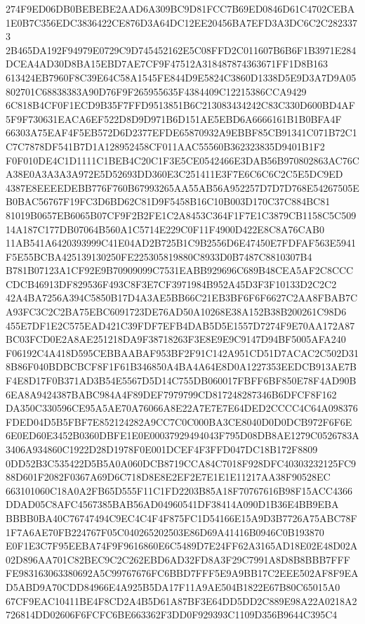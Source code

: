 \documentclass[UTF8,fontset=fandol,zihao=-4,a4paper]{ctexart}
\begin{document}
{{274F9ED06DB0BEBEBE2AAD6A309BC9D81FCC7B69ED0846D61C4702CEBA1E0B7C356EDC3836422CE876D3A64DC12EE20456BA7EFD3A3DC6C2C2823373
2B465DA192F94979E0729C9D745452162E5C08FFD2C011607B6B6F1B3971E284DCEA4AD30D8BA15EBD7AE7CF9F47512A318487874363671FF1D8B163
613424EB7960F8C39E64C58A1545FE844D9E5824C3860D1338D5E9D3A7D9A05802701C68838383A90D76F9F265955635F4384409C12215386CCA9429
6C818B4CF0F1ECD9B35F7FFD9513851B6C213083434242C83C330D600BD4AF5F9F730631EACA6EF522D8D9D971B6D151AE5EBD6A6666161B1B0BFA4F
66303A75EAF4F5EB572D6D2377EFDE65870932A9EBBF85CB91341C071B72C1C7C7878DF541B7D1A128952458CF011AAC55560B362323835D9401B1F2
F0F010DE4C1D1111C1BEB4C20C1F3E5CE0542466E3DAB56B970802863AC76CA38E0A3A3A3A972E5D52693DD360E3C251411E3F7E6C6C6C2C5E5DC9ED
4387E8EEEEDEBB776F760B67993265AA55AB56A952257D7D7D768E54267505EB0BAC56767F19FC3D6BD62C81D9F5458B16C10B003D170C37C884BC81
81019B0657EB6065B07CF9F2B2FE1C2A8453C364F1F7E1C3879CB1158C5C50914A187C177DB07064B560A1C5714E229C0F11F4900D422E8C8A76CAB0
11AB541A6420393999C41E04AD2B725B1C9B2556D6E47450E7FDFAF563E5941F5E55BCBA425139130250FE225305819880C8933D0B7487C8810307B4
B781B07123A1CF92E9B70909099C7531EABB929696C689B48CEA5AF2C8CCCCDCB46913DF829536F493C8F3E7CF3971984B952A45D3F3F10133D2C2C2
42A4BA7256A394C5850B17D4A3AE5BB66C21EB3BF6F6F6627C2AA8FBAB7CA93FC3C2C2BA75EBC6091723DE76AD50A10268E38A152B38B200261C98D6
455E7DF1E2C575EAD421C39FDF7EFB4DAB5D5E1557D7274F9E70AA172A87BC03FCD0E2A8AE251218DA9F38718263F3E8E9E9C9147D94BF5005AFA240
F06192C4A418D595CEBBAABAF953BF2F91C142A951CD51D7ACAC2C502D318B86F040BDBCBCF8F1F61B346850A4BA4A64E8D0A1227353EEDCB913AE7B
F4E8D17F0B371AD3B54E5567D5D14C755DB060017FBFF6BF850E78F4AD90B6EA8A9424387BABC984A4F89DEF7979799CD817248287346B6DFCF8F162
DA350C330596CE95A5AE70A76066A8E22A7E7E7E64DED2CCCC4C64A098376FDED04D5B5FBF7E852124282A9CC7C0C000BA3CE8040D0D0DCB972F6F6E
6E0ED60E3452B0360DBFE1E0E00037929494043F795D08DB8AE1279C0526783A3406A934860C1922D28D1978F0E001DCEF4F3FFD047DC18B172F8809
0DD52B3C535422D5B5A0A060DCB8719CCA84C7018F928DFC40303232125FC988D601F2082F0367A69D6C718D8E8E2EF2E7E1E1E11217AA38F90528EC
663101060C18A0A2FB65D555F11C1FD2203B85A18F70767616B98F15ACC4366DDAD05C8AFC4567385BAB56AD04960541DF38414A090D1B36E4BB9EBA
BBBB0BA40C76747494C9EC4C4F4F875FC1D54166E15A9D3B7726A75ABC78F1F7A6AE70FB224767F05C040265202503E86D69A41416B0946C0B193870
E0F1E3C7F95EEBA74F9F9616860E6C5489D7E24FF62A3165AD18E02E48D02A02D896AA701C82BEC9C2C262EBD6AD32FD8A3F29C7991A8D8B8BBB7FFF
FE983163063380692A5C99767676FC6BBD7FFF5E9A9BB17C2EEE502AF8F9EAD5ABD9A70CDD84966E4A925B5DA17F11A9AE504B1822E67B80C65015A0
67CF9EAC10411BE4F8CD2A4B5D61A87BF3E64DD5DD2C889E98A22A0218A2726814DD02606F6FCFC6BE663362F3DD0F929393C1109D356B9644C395C4
}}
\end{document}
